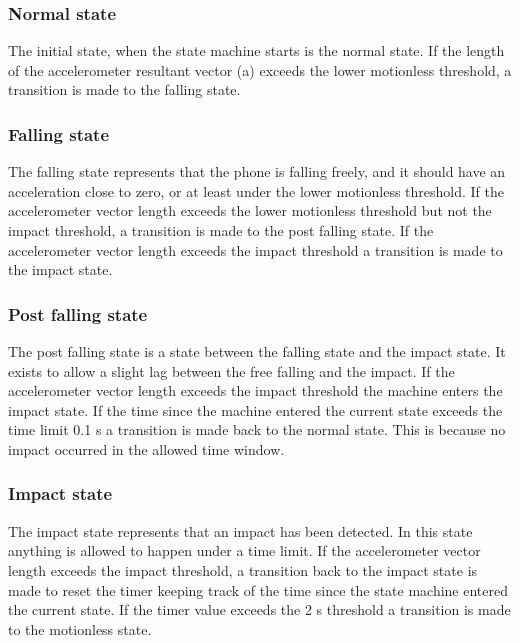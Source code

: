 \documentclass[12pt, a4paper, onecolumn]{article}
\begin{document}
	\subsubsection{Normal state}
	
	The initial state, when the state machine starts is the normal state. If the length of the accelerometer resultant vector (a) exceeds the lower motionless threshold, a transition is made to the falling state.
	
	\subsubsection{Falling state}
	
	The falling state represents that the phone is falling freely, and it should have an acceleration close to zero, or at least under the lower motionless threshold. If the accelerometer vector length exceeds the lower motionless threshold but not the impact threshold, a transition is made to the post falling state. If the accelerometer vector length exceeds the impact threshold a transition is made to the impact state.
	
	\subsubsection{Post falling state}
	
	The post falling state is a state between the falling state and the impact state. It exists to allow a slight lag between the free falling and the impact. If the accelerometer vector length exceeds the impact threshold the machine enters the impact state. If the time since the machine entered the current state exceeds the time limit 0.1 s a transition is made back to the normal state. This is because no impact occurred in the allowed time window.
	
	\subsubsection{Impact state}
	
	The impact state represents that an impact has been detected. In this state anything is allowed to happen under a time limit. If the accelerometer vector length exceeds the impact threshold, a transition back to the impact state is made to reset the timer keeping track of the time since the state machine entered the current state. If the timer value exceeds the 2 s threshold a transition is made to the motionless state.
	
\end{document}
